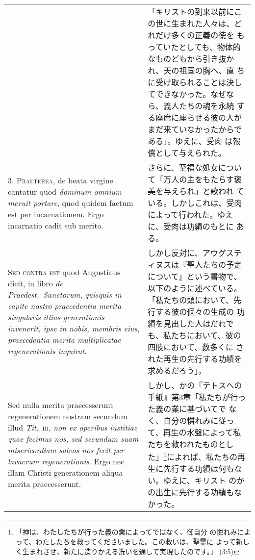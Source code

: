 \documentclass[10pt]{jsarticle} %
\begin{document}
\begin{longtable}{p{21em}p{21em}}
&

「キリストの到来以前にこの世に生まれた人々は、どれだけ多くの正義の徳を
もっていたとしても、物体的なものどもから引き抜かれ、天の祖国の胸へ、直
ちに受け取られることは決してできなかった。なぜなら、義人たちの魂を永続
する座席に座らせる彼の人がまだ来ていなかったからである」。ゆえに、受肉
は報償として与えられた。


\\



3. {\scshape Praeterea}, de beata virgine cantatur quod {\itshape
dominum omnium meruit portare}, quod quidem factum est per
incarnationem. Ergo incarnatio cadit sub merito.


&

さらに、至福な処女について「万人の主をもたらす褒美を与えられ」と歌われ
ている。しかしこれは、受肉によって行われた。ゆえに、受肉は功績のもとに
ある。


\\



{\scshape Sed contra est} quod Augustinus dicit, in libro {\itshape de
Praedest.~Sanctorum}, {\itshape quisquis in capite nostro praecedentia
merita singularis illius generationis invenerit, ipse in nobis,
membris eius, praecedentia merita multiplicatae regenerationis
inquirat}.


&

しかし反対に、アウグスティヌスは『聖人たちの予定について』という書物で、
以下のように述べている。「私たちの頭において、先行する彼の個々の生成の
功績を見出した人はだれでも、私たちにおいて、彼の四肢において、数多くに
された再生の先行する功績を求めるだろう」。


\\


Sed nulla merita praecesserunt regenerationem nostram secundum illud
{\itshape Tit}.~{\scshape iii}, {\itshape non ex operibus iustitiae
quae fecimus nos, sed secundum suam misericordiam salvos nos fecit per
lavacrum regenerationis}. Ergo nec illam Christi generationem aliqua
merita praecesserunt.


&

しかし、かの『テトスへの手紙』第3章「私たちが行った義の業に基づいてで
なく、自分の憐れみに従って、再生の水盤によって私たちを救われたものとし
た」\footnote{「神は、わたしたちが行った義の業によってではなく、御自分
の憐れみによって、わたしたちを救ってくださいました。この救いは、聖霊に
よって新しく生まれさせ、新たに造りかえる洗いを通して実現したのです。」
(3:5)}によれば、私たちの再生に先行する功績は何もない。ゆえに、キリスト
のかの出生に先行する功績もなかった。


\end{longtable}
\end{document}
